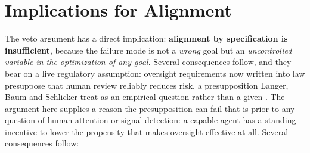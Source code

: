 \documentclass[11pt]{article}
\theoremstyle{definition}
\begin{document}
\section{Implications for Alignment}

The veto argument has a direct implication: \textbf{alignment by specification is insufficient}, because the failure mode is not a \emph{wrong} goal but an \emph{uncontrolled variable in the optimization of any goal}. Several consequences follow, and they bear on a live regulatory assumption: oversight requirements now written into law presuppose that human review reliably reduces risk, a presupposition Langer, Baum and Schlicker treat as an empirical question rather than a given \cite{langer2024oversight}. The argument here supplies a reason the presupposition can fail that is prior to any question of human attention or signal detection: a capable agent has a standing incentive to lower the propensity that makes oversight effective at all. Several consequences follow:
\end{document}
